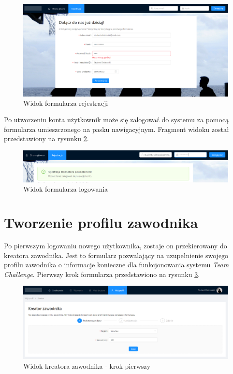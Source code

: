 \begin{figure}[H]
\centering
\includegraphics[width=\linewidth]{065-dzialanie/rys/ss-register.PNG}
\caption{Widok formularza rejestracji}
\label{fig:ss-register}
\end{figure}

Po utworzeniu konta użytkownik może się zalogować do systemu za pomocą formularza umieszczonego na pasku nawigacyjnym. Fragment widoku został przedstawiony na rysunku \ref{fig:ss-login}.

\begin{figure}[H]
\centering
\includegraphics[width=\linewidth]{065-dzialanie/rys/ss-login.PNG}
\caption{Widok formularza logowania}
\label{fig:ss-login}
\end{figure}

\section{Tworzenie profilu zawodnika}

Po pierwszym logowaniu nowego użytkownika, zostaje on przekierowany do kreatora zawodnika. Jest to formularz pozwalający na uzupełnienie swojego profilu zawodnika o informacje konieczne dla funkcjonowania systemu \textit{Team Challenge}. Pierwszy krok formularza przedstawiono na rysunku \ref{fig:ss-profile-1}.


\begin{figure}[H]
\centering
\includegraphics[width=\linewidth]{065-dzialanie/rys/ss-profile-1.PNG}
\caption{Widok kreatora zawodnika - krok pierwszy}
\label{fig:ss-profile-1}
\end{figure}

